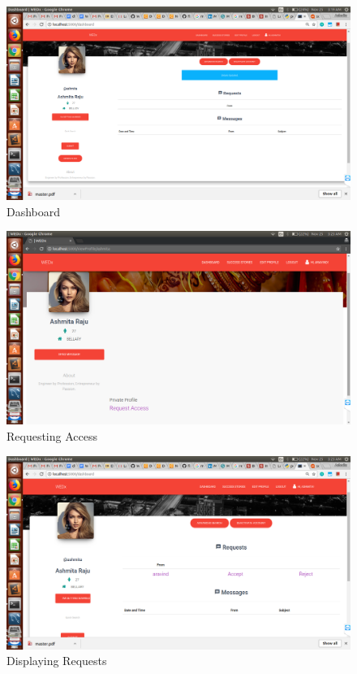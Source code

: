 \documentclass[12pt]{report}
\begin{document}
\begin{figure}[!htb]
    \centering
    \includegraphics[width=1\textwidth]{sc-9.png}
    \caption{Dashboard}
    \label{fig:Dashboard}
\end{figure}

\begin{figure}[!htb]
    \centering
    \includegraphics[width=1\textwidth]{sc-10.png}
    \caption{Requesting Access}
    \label{fig:Requesting Access}
\end{figure}

\begin{figure}[!htb]
    \centering
    \includegraphics[width=1\textwidth]{sc-11.png}
    \caption{Displaying Requests}
    \label{fig:Displaying Requests}
\end{figure}
\end{document}
